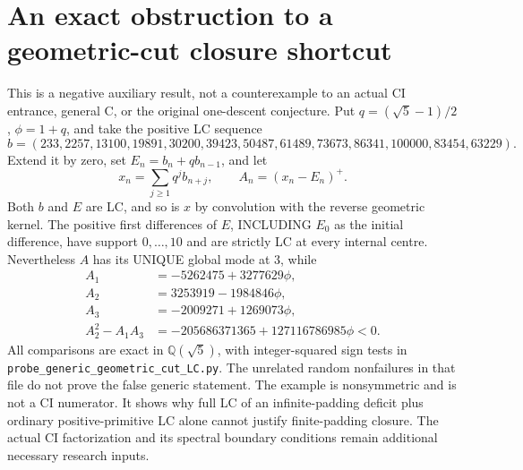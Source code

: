 \section{An exact obstruction to a geometric-cut closure shortcut}
This is a negative auxiliary result, not a counterexample to an actual
CI entrance, general C, or the original one-descent conjecture.
Put $q=(\sqrt5-1)/2$, $\phi=1+q$, and take the positive LC sequence
\[
b=(233,2257,13100,19891,30200,39423,50487,61489,
    73673,86341,100000,83454,63229).
\]
Extend it by zero, set $E_n=b_n+qb_{n-1}$, and let
\[
 x_n=\sum_{j\ge1}q^j b_{n+j},\qquad A_n=(x_n-E_n)^+.
\]
Both $b$ and $E$ are LC, and so is $x$ by convolution with the
reverse geometric kernel. The positive first differences of $E$,
INCLUDING $E_0$ as the initial difference, have support $0,\ldots,10$
and are strictly LC at every internal centre.
Nevertheless $A$ has its UNIQUE global mode at $3$, while
\[
\begin{aligned}
A_1&=-5262475+3277629\phi,\\
A_2&=3253919-1984846\phi,\\
A_3&=-2009271+1269073\phi,\\
A_2^2-A_1A_3&=-205686371365+127116786985\phi<0.
\end{aligned}
\]
All comparisons are exact in $\mathbb Q(\sqrt5)$, with integer-squared
sign tests in \texttt{probe\_generic\_geometric\_cut\_LC.py}.
The unrelated random nonfailures in that file do not prove the false
generic statement. The example is nonsymmetric and is not a CI
numerator. It shows why full LC of an infinite-padding deficit plus
ordinary positive-primitive LC alone cannot justify finite-padding
closure. The actual CI factorization and its spectral boundary
conditions remain additional necessary research inputs.
